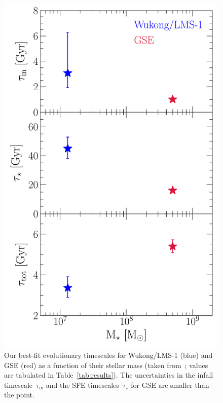\documentclass[foo.tex]{subfiles}
\begin{document}
\begin{figure}
\centering
\includegraphics[scale = 0.63]{gse_wukong_timescales.pdf}
\caption{
Our best-fit evolutionary timescales for Wukong/LMS-1 (blue) and GSE (red) as a
function of their stellar mass (taken from~\citealt{Naidu2022}; values are
tabulated in Table~\ref{tab:results}).
The uncertainties in the infall timescale~$\tau_\text{in}$ and the SFE
timescales~$\tau_\star$ for GSE are smaller than the point.
}
\label{fig:gse_wukong_timescales}
\end{figure}
\end{document}
